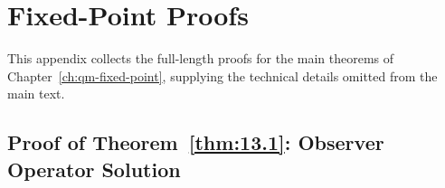 
\chapter{Fixed-Point Proofs}
\label{app:fixed-point-proofs}

This appendix collects the full-length proofs for the main theorems
of Chapter~\ref{ch:qm-fixed-point}, supplying the technical details
omitted from the main text.

\section{Proof of Theorem~\ref{thm:13.1}: Observer Operator Solution}
\label{app:pf-observer}

